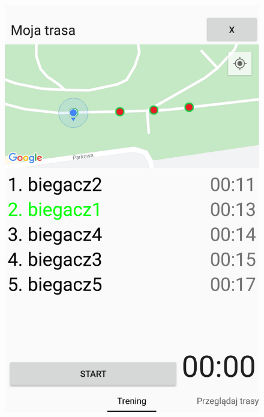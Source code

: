 \begin{figure}
\centering
\begin{minipage}{.5\textwidth}
  \centering
  \includegraphics[width=.8\linewidth,frame]{img/rywalizacjaw1}
  \label{image:rywalizacjaw1}
\end{minipage}%
\begin{minipage}{.5\textwidth}
  \centering

\end{minipage}
\end{figure}

